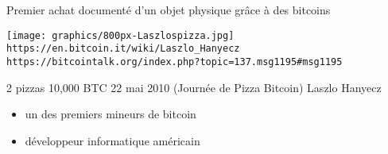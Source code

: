 

\begin{frame}{\vskip -0.2cm\Large Premier achat document\'e d'un objet physique gr\^ace \`a des bitcoins}

\begin{multicols}{2}

	\begin{flushleft}
	\mbox{}\vskip -0.4cm
	\texttt{[image: graphics/800px-Laszlospizza.jpg]}
	\vskip -0.1cm
	{\tiny\texttt{https://en.bitcoin.it/wiki/Laszlo\_Hanyecz}}
	\vskip -0.2cm
	{\tiny\texttt{https://bitcointalk.org/index.php?topic=137.msg1195\#msg1195}}
	
	\end{flushleft}

\columnbreak

	\begin{flushright}

		\begin{minipage}{2.7cm}{\bf
		\begin{center}
		
		\mbox{}\vskip 0.2cm
		{\huge\color{red}2 pizzas}
		\vskip 0.5cm
		{\Large 10,000 BTC}
		\vskip 0.5cm
		{\Large 22 mai 2010}
		\vskip -0.175cm
		{\tiny(Journ\'ee de Pizza Bitcoin)}		
		\vskip 0.5cm
		Laszlo Hanyecz
		\vskip -0.1cm
		{\tiny\begin{itemize}
		\item
			un des premiers mineurs de bitcoin
		\item
			d\'eveloppeur informatique am\'ericain
		\end{itemize}}
				
		\end{center}
    		}\end{minipage}
		
	
	\end{flushright}

\end{multicols}

\normalsize
\end{frame}


